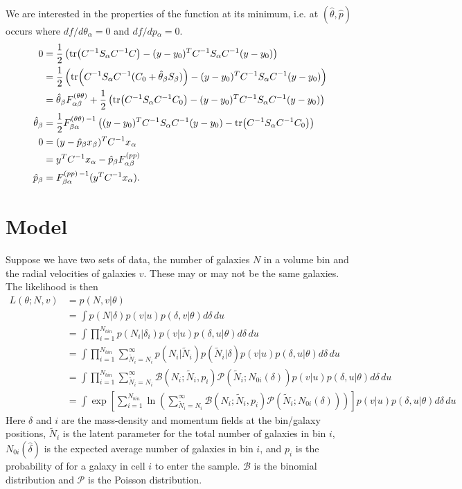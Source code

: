 \documentclass{article}
\begin{document}
We are interested in the properties of the function at its minimum, i.e. at $(\hat{\theta},\hat{p})$ occurs where $df/d\theta_\alpha=0 $ and $df/dp{_\alpha}=0$.
\begin{align}
0 & = \frac{1}{2}\left(\tr(C^{-1}S_\alpha C^{-1} C)  - (y-y_0)^T  C^{-1} S_{\alpha} C^{-1}  (y-y_0)\right) \\
& = \frac{1}{2}\left(\tr(C^{-1}S_\alpha C^{-1} (C_0 + \hat{\theta}_\beta S_\beta) )  - (y-y_0)^T  C^{-1} S_{\alpha} C^{-1}  (y-y_0)\right) \\
& =\hat{ \theta}_\beta F^{(\theta \theta)}_{\alpha \beta} +  \frac{1}{2}\left(\tr(C^{-1}S_\alpha C^{-1} C_0)  - (y-y_0)^T  C^{-1} S_{\alpha} C^{-1}  (y-y_0)\right) \\
\hat{ \theta}_\beta  & =  \frac{1}{2} F^{(\theta \theta)\, -1}_{\beta \alpha} \left( (y-y_0)^T  C^{-1} S_{\alpha} C^{-1}  (y-y_0) - \tr(C^{-1}S_\alpha C^{-1} C_0) \right) \\
0 &=  (y-\hat{p}_\beta x_\beta )^T C^{-1} x_\alpha \\
& = y^TC^{-1} x_\alpha - \hat{p}_\beta F^{(pp)}_{\alpha \beta} \\
 \hat{p}_\beta  & =   F^{(pp)\,-1}_{\beta \alpha} (y^TC^{-1} x_\alpha ).
\end{align}
\newpage
\section{Model}

Suppose we have two sets of data, the number of galaxies $N$ in a volume
bin and the radial velocities of galaxies $v$.  These may or may not be the same galaxies.
The likelihood is then
\begin{align}
L(\theta; N, v) & =p(N, v| \theta) \\
&= \int  p(N | \delta)  p(v | u)  p(\delta,v| \theta) d\delta\, du\\ 
& = \int  \prod_{i=1}^{N_{bin}}   p(N_i | \delta_i)p(v| u) p(\delta, u | \theta)d\delta\, du\\ 
& = \int  \prod_{i=1}^{N_{bin}}  \sum_{\tilde{N}_i =N_i}^\infty  p(N_i | \tilde{N}_i) p(\tilde{N}_i | \delta) p(v| u) p(\delta, u | \theta) d\delta\, du \\
& = \int  \prod_{i=1}^{N_{bin}}  \sum_{\tilde{N}_i =N_i}^\infty  \mathcal{B}(N_i; \tilde{N}_i, p_i) \mathcal{P}(\tilde{N}_i ; N_{0i}(\delta))p(v| u) p(\delta, u | \theta) d\delta\, du \\
&= \int  \exp \left[ \sum_{i=1}^{N_{bin}} \ln{  \left( \sum_{\tilde{N}_i =N_i}^\infty  \mathcal{B}(N_i; \tilde{N}_i, p_i) \mathcal{P}(\tilde{N}_i ; N_{0i}(\delta))\right)} \right]  p(v| u) p(\delta, u | \theta) d\delta\, du
\end{align}
Here $\delta$ and $i$ are  the mass-density  and momentum fields at the bin/galaxy positions, $\tilde{N}_i$ is the latent parameter
for the  total number of galaxies in bin $i$, $N_{0i}(\hat{\delta})$ is the expected
average number of galaxies in bin $i$, and $p_i$ is the probability of for a galaxy in cell $i$ to enter the sample.
$\mathcal{B}$ is the binomial distribution and $\mathcal{P}$ is the Poisson distribution.
\end{document}
